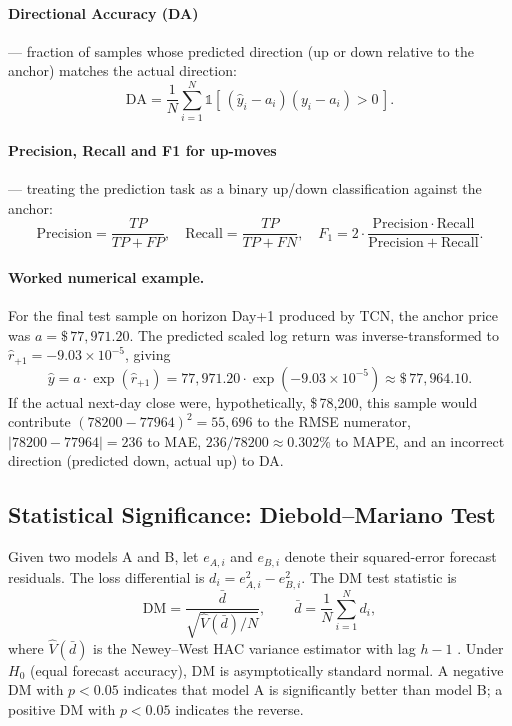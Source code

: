\documentclass[12pt]{article}
\begin{document}
\paragraph{Directional Accuracy (DA)} --- fraction of samples whose predicted direction (up or down relative to the anchor) matches the actual direction:
\begin{equation}
    \mathrm{DA} = \frac{1}{N}\sum_{i=1}^{N} \mathbb{1}\!\left[\,(\hat{y}_i - a_i)(y_i - a_i) > 0\,\right].
\label{eq:da}
\end{equation}

\paragraph{Precision, Recall and F1 for up-moves} --- treating the prediction task as a binary up/down classification against the anchor:
\begin{equation}
    \mathrm{Precision} = \frac{TP}{TP + FP},\quad \mathrm{Recall} = \frac{TP}{TP + FN},\quad
    F_1 = 2\cdot\frac{\mathrm{Precision}\cdot\mathrm{Recall}}{\mathrm{Precision}+\mathrm{Recall}}.
\label{eq:prf1}
\end{equation}

\paragraph{Worked numerical example.} For the final test sample on horizon Day+1 produced by TCN, the anchor price was $a = \$\,77{,}971.20$. The predicted scaled log return was inverse-transformed to $\hat{r}_{+1} = -9.03\times 10^{-5}$, giving
\[
\hat{y} = a\cdot \exp(\hat{r}_{+1}) = 77{,}971.20\cdot \exp(-9.03\times 10^{-5}) \approx \$\,77{,}964.10.
\]
If the actual next-day close were, hypothetically, \$\,78{,}200, this sample would contribute $(78200 - 77964)^2 = 55{,}696$ to the RMSE numerator, $|78200-77964| = 236$ to MAE, $236/78200 \approx 0.302\%$ to MAPE, and an incorrect direction (predicted down, actual up) to DA.

\subsection{Statistical Significance: Diebold--Mariano Test}

Given two models A and B, let $e_{A,i}$ and $e_{B,i}$ denote their squared-error forecast residuals. The loss differential is $d_i = e_{A,i}^2 - e_{B,i}^2$. The DM test statistic is
\begin{equation}
    \mathrm{DM} = \frac{\bar{d}}{\sqrt{\hat{V}(\bar{d})/N}},\qquad \bar{d} = \frac{1}{N}\sum_{i=1}^{N} d_i,
\label{eq:dm}
\end{equation}
where $\hat{V}(\bar{d})$ is the Newey--West HAC variance estimator with lag $h-1$ \cite{dieboldmariano1995}. Under $H_0$ (equal forecast accuracy), DM is asymptotically standard normal. A negative DM with $p<0.05$ indicates that model A is significantly better than model B; a positive DM with $p<0.05$ indicates the reverse.
\end{document}
